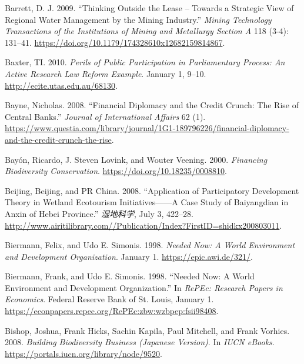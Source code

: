 \begin{CSLReferences}{1}{1}
Barrett, D. J. 2009. {``Thinking Outside the Lease -- Towards a
Strategic View of Regional Water Management by the Mining Industry.''}
\emph{Mining Technology Transactions of the Institutions of Mining and
Metallurgy Section A} 118 (3-4): 131--41.
\url{https://doi.org/10.1179/174328610x12682159814867}.

Baxter, TI. 2010. \emph{Perils of Public Participation in Parliamentary
Process: An Active Research Law Reform Example}. January 1, 9--10.
\url{http://ecite.utas.edu.au/68130}.

Bayne, Nicholas. 2008. {``Financial Diplomacy and the Credit Crunch: The
Rise of Central Banks.''} \emph{Journal of International Affairs} 62
(1).
\url{https://www.questia.com/library/journal/1G1-189796226/financial-diplomacy-and-the-credit-crunch-the-rise}.

Bayón, Ricardo, J. Steven Lovink, and Wouter Veening. 2000.
\emph{Financing Biodiversity Conservation}.
\url{https://doi.org/10.18235/0008810}.

Beijing, Beijing, and PR China. 2008. {``Application of Participatory
Development Theory in Wetland Ecotourism Initiatives------A Case Study
of Baiyangdian in Anxin of Hebei Province.''} \emph{湿地科学}, July 3,
422--28.
\url{http://www.airitilibrary.com//Publication/Index?FirstID=shidkx200803011}.

Biermann, Felix, and Udo E. Simonis. 1998. \emph{Needed Now: A World
Environment and Development Organization}. January 1.
\url{https://epic.awi.de/321/}.

Biermann, Frank, and Udo E. Simonis. 1998. {``Needed Now: A World
Environment and Development Organization.''} In \emph{RePEc: Research
Papers in Economics}. Federal Reserve Bank of St. Louis, January 1.
\url{https://econpapers.repec.org/RePEc:zbw:wzbpep:fsii98408}.

Bishop, Joshua, Frank Hicks, Sachin Kapila, Paul Mitchell, and Frank
Vorhies. 2008. \emph{Building Biodiversity Business (Japanese Version)}.
In \emph{IUCN eBooks}. \url{https://portals.iucn.org/library/node/9520}.


\end{CSLReferences}
